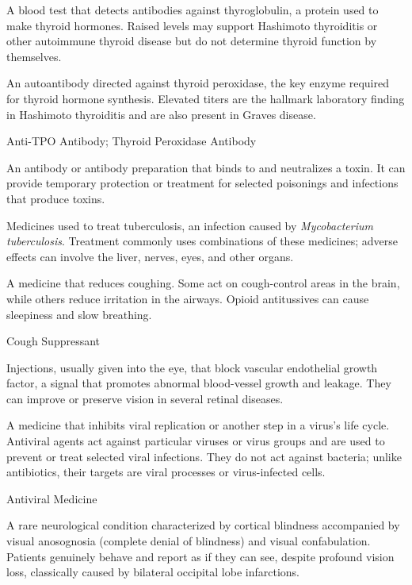  A blood test that detects antibodies against thyroglobulin, a protein used to make thyroid hormones. Raised levels may support Hashimoto thyroiditis or other autoimmune thyroid disease but do not determine thyroid function by themselves.

 An autoantibody directed against thyroid peroxidase, the key enzyme required for thyroid hormone synthesis. Elevated titers are the hallmark laboratory finding in Hashimoto thyroiditis and are also present in Graves disease.

\synonyms
Anti-TPO Antibody; Thyroid Peroxidase Antibody

 An antibody or antibody preparation that binds to and neutralizes a toxin. It can provide temporary protection or treatment for selected poisonings and infections that produce toxins.

 Medicines used to treat tuberculosis, an
infection caused by \textit{Mycobacterium tuberculosis}. Treatment commonly
uses combinations of these medicines; adverse effects can involve the liver,
nerves, eyes, and other organs.

 A medicine that reduces coughing. Some act on cough-control
areas in the brain, while others reduce irritation in the airways. Opioid
antitussives can cause sleepiness and slow breathing.

\synonyms
Cough Suppressant

 Injections, usually given into the eye, that block vascular endothelial growth factor, a signal that promotes abnormal blood-vessel growth and leakage. They can improve or preserve vision in several retinal diseases.

 A medicine that inhibits viral replication or another step in a virus's life cycle. Antiviral agents act against particular
viruses or virus groups and are used to prevent or treat selected viral infections. They do not act against bacteria; unlike antibiotics,
their targets are viral processes or virus-infected cells.

\synonyms
Antiviral Medicine

 A rare neurological condition characterized by cortical blindness accompanied by visual anosognosia (complete denial of blindness) and visual confabulation. Patients genuinely behave and report as if they can see, despite profound vision loss, classically caused by bilateral occipital lobe infarctions.

